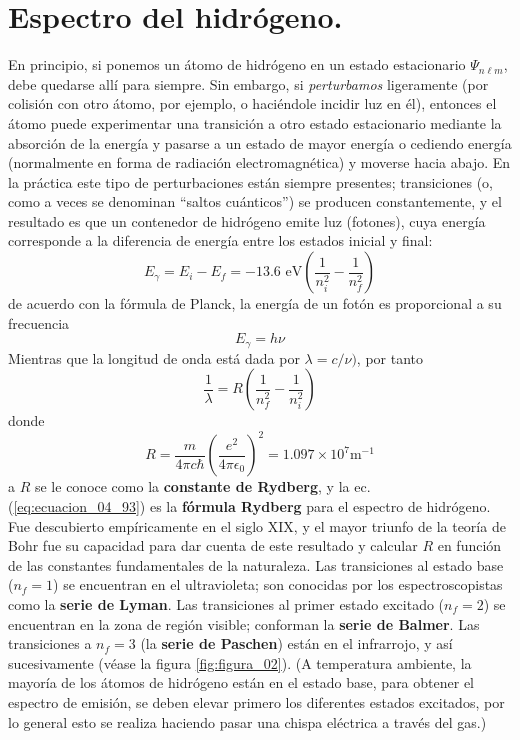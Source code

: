 \section{Espectro del hidrógeno.}
En principio, si ponemos un átomo de hidrógeno en un estado estacionario $\Psi_{n \ell m}$, debe quedarse allí para siempre. Sin embargo, si \emph{perturbamos} ligeramente (por colisión con otro átomo, por ejemplo, o haciéndole incidir  luz en él), entonces el átomo puede experimentar una transición a otro estado estacionario mediante la absorción de la energía y pasarse a un estado de mayor energía o cediendo energía (normalmente en forma de radiación electromagnética) y moverse  hacia abajo. En la práctica este tipo de perturbaciones están siempre presentes; transiciones (o, como a veces se denominan ``saltos cuánticos'') se producen constantemente, y el resultado es que un contenedor de hidrógeno emite luz (fotones), cuya energía corresponde a la diferencia de energía entre los estados inicial y final:
\begin{equation}
E_{\gamma} = E_{i} - E_{f} = -13.6 \text{ eV} \left( \dfrac{1}{n_{i}^{2}} - \dfrac{1}{n_{f}^{2}} \right)
\label{eq:ecuacion_04_91}
\end{equation}
de acuerdo con la fórmula de Planck, la energía de un fotón es proporcional a su frecuencia
\begin{equation}
E_{\gamma} = h \nu
\label{eq:ecuacion_04_92}
\end{equation}
Mientras que la longitud de onda está dada por $\lambda = c / \nu)$, por tanto
\begin{equation}
\dfrac{1}{\lambda} = R \left( \dfrac{1}{n_{f}^{2}} - \dfrac{1}{n_{i}^{2}} \right)
\label{eq:ecuacion_04_93}
\end{equation}
donde
\begin{equation}
R = \dfrac{m}{4 \pi c \hbar} \left( \dfrac{e^{2}}{4 \pi \epsilon_{0}} \right)^{2} = 1.097 \times 10^{7} \text{m}^{-1}
\label{eq:ecuacion_04_94}
\end{equation}
a $R$ se le conoce como la \textbf{constante de Rydberg}, y la ec. (\ref{eq:ecuacion_04_93}) es la \textbf{fórmula Rydberg} para el espectro de hidrógeno. Fue descubierto empíricamente en el siglo XIX, y el mayor triunfo de la teoría de Bohr fue su capacidad para dar cuenta de este resultado y calcular $R$ en función de las constantes fundamentales de la naturaleza. Las transiciones al estado base ($n_{f}= 1$) se encuentran en el ultravioleta; son conocidas por los espectroscopistas como la \textbf{serie de Lyman}. Las transiciones al primer estado excitado ($n_{f}= 2$) se encuentran en la zona de región visible; conforman la \textbf{serie de Balmer}. Las transiciones a $n_{f} = 3$ (la \textbf{serie de Paschen}) están en el infrarrojo, y así sucesivamente (véase la figura \ref{fig:figura_02}). (A temperatura ambiente, la mayoría de los átomos de hidrógeno están en el estado base, para obtener el espectro de emisión, se deben elevar primero los diferentes estados excitados, por lo general esto se realiza haciendo pasar una chispa eléctrica a través del gas.)
